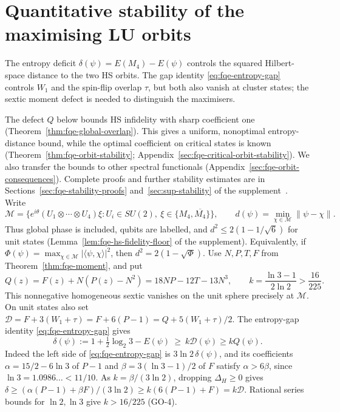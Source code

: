 \section{Quantitative stability of the maximising LU orbits}
\label{sec:fqe-orbit-stability}

The entropy deficit $\delta(\psi)=E(M_4)-E(\psi)$ controls the
squared Hilbert-space distance to the two HS orbits. The gap identity
\eqref{eq:fqe-entropy-gap} controls $W_1$ and the spin-flip overlap
$\tau$, but both also vanish at cluster states; the sextic moment
defect is needed to distinguish the maximisers.

The defect $Q$ below bounds HS infidelity with sharp coefficient one
(Theorem~\ref{thm:fqe-global-overlap}). This gives a uniform, nonoptimal
entropy-distance bound, while the optimal coefficient on critical
states is known (Theorem~\ref{thm:fqe-orbit-stability};
Appendix~\ref{sec:fqe-critical-orbit-stability}). We also transfer the
bounds to other spectral functionals
(Appendix~\ref{sec:fqe-orbit-consequences}). Complete proofs and
further stability estimates are in
Sections~\ref{sec:fqe-stability-proofs} and~\ref{sec:sup-stability}
of the supplement~\cite{Companion}.
Write
\[
 \mathcal M=\{e^{i\theta}(U_1\otimes\cdots\otimes U_4)\xi:
       U_i\in SU(2),\ \xi\in\{M_4,\overline{M_4}\}\},\qquad
 d(\psi)=\min_{\chi\in\mathcal M}\|\psi-\chi\|.
\]
Thus global phase is included, qubits are labelled, and
$d^2\le2(1-1/\sqrt6)$ for unit states
(Lemma~\ref{lem:fqe-hs-fidelity-floor} of the supplement). Equivalently, if $\Phi(\psi)=\max_{\chi\in\mathcal M}
|\langle\psi,\chi\rangle|^2$, then $d^2=2(1-\sqrt{\Phi})$.
Use $N,P,T,F$ from Theorem~\ref{thm:fqe-moment}, and put
\[
 Q(z)=F(z)+N(P(z)-N^2)=18NP-12T-13N^3,\qquad
 k=\frac{\ln3-1}{2\ln2}>\frac{16}{225}.
\]
This nonnegative homogeneous sextic vanishes on the unit sphere precisely at $\mathcal M$. On unit states also set
$\mathcal D=F+3(W_1+\tau)=F+6(P-1)=Q+5(W_1+\tau)/2$.
The entropy-gap identity \eqref{eq:fqe-entropy-gap} gives
\begin{equation}\label{eq:fqe-orbit-surrogate}
 \delta(\psi):=1+\tfrac12\log_2 3-E(\psi)\ \ge\ k\mathcal D(\psi)\ge k Q(\psi).
\end{equation}
Indeed the left side of \eqref{eq:fqe-entropy-gap} is $3\ln2\,\delta(\psi)$, and its coefficients
$\alpha=15/2-6\ln3$ of $P-1$ and $\beta=3(\ln3-1)/2$ of $F$ satisfy $\alpha>6\beta$, since $\ln3=1.0986\ldots<11/10$.
As $k=\beta/(3\ln2)$, dropping $\Delta_H\ge0$ gives
$\delta\ge(\alpha(P-1)+\beta F)/(3\ln2)\ge k(6(P-1)+F)=k\mathcal D$.
Rational series bounds for $\ln2,\ln3$ give $k>16/225$ (GO-4).

